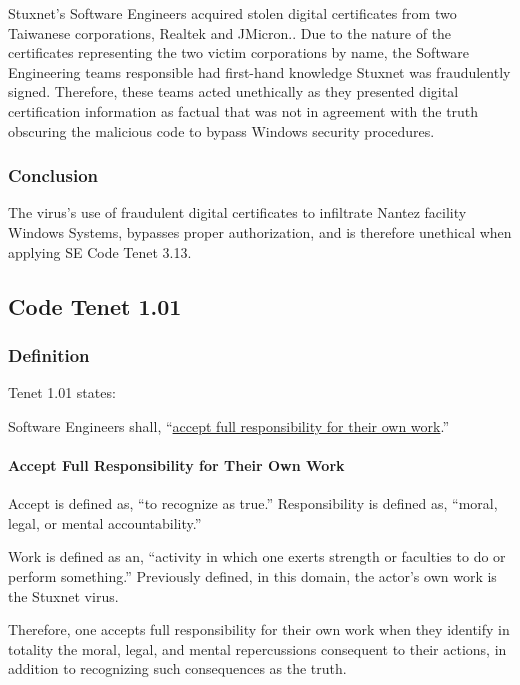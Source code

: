 \documentclass[12pt]{article}
\begin{document}
\begin{multicols}{2}
Stuxnet's Software Engineers acquired stolen digital certificates from two Taiwanese corporations, Realtek and JMicron.\cite{signedUsingCertificates}. Due to the nature of the certificates representing the two victim corporations by name, the Software Engineering teams responsible had first-hand knowledge Stuxnet was fraudulently signed. Therefore, these teams acted unethically as they presented digital certification information as factual that was not in agreement with the truth obscuring the malicious code to bypass Windows security procedures.

\subsubsection{Conclusion}

The virus's use of fraudulent digital certificates to infiltrate Nantez facility Windows Systems, bypasses proper authorization, and is therefore unethical when applying SE Code Tenet 3.13.\newpage

\subsection{Code Tenet 1.01}

\subsubsection{Definition}

Tenet 1.01 states:

\begin{framed}
Software Engineers shall, ``\ul{accept full responsibility for their own work}.''\cite{softwareEngineeringCodeOfEthics}
\end{framed}

\paragraph{Accept Full Responsibility for Their Own Work}

Accept is defined as, ``to recognize as true.''\cite{merriamWebsterDefinitions} Responsibility is defined as, ``moral, legal, or mental accountability.''\cite{merriamWebsterDefinitions}

Work is defined as an, ``activity in which one exerts strength or faculties to do or perform something.''\cite{cambridgeDictionary} Previously defined, in this domain, the actor's own work is the Stuxnet virus.

Therefore, one accepts full responsibility for their own work when they identify in totality the moral, legal, and mental repercussions consequent to their actions, in addition to recognizing such consequences as the truth.\cite{cambridgeDictionary}


\end{multicols}
\end{document}
